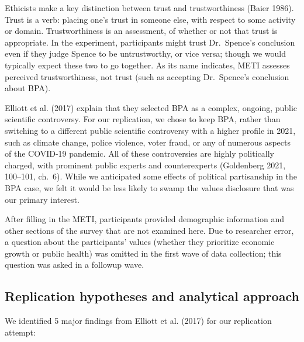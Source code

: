 \documentclass[
  letterpaper,
  DIV=11,
  numbers=noendperiod]{scrartcl}
\begin{document}
Ethicists make a key distinction between trust and trustworthiness
(Baier 1986). Trust is a verb: placing one's trust in someone else, with
respect to some activity or domain. Trustworthiness is an assessment, of
whether or not that trust is appropriate. In the experiment,
participants might trust Dr.~Spence's conclusion even if they judge
Spence to be untrustworthy, or vice versa; though we would typically
expect these two to go together. As its name indicates, METI assesses
perceived trustworthiness, not trust (such as accepting Dr.~Spence's
conclusion about BPA).

Elliott et al. (2017) explain that they selected BPA as a complex,
ongoing, public scientific controversy. For our replication, we chose to
keep BPA, rather than switching to a different public scientific
controversy with a higher profile in 2021, such as climate change,
police violence, voter fraud, or any of numerous aspects of the COVID-19
pandemic. All of these controversies are highly politically charged,
with prominent public experts and counterexperts (Goldenberg 2021,
100--101, ch.~6). While we anticipated some effects of political
partisanship in the BPA case, we felt it would be less likely to swamp
the values disclosure that was our primary interest.

After filling in the METI, participants provided demographic information
and other sections of the survey that are not examined here. Due to
researcher error, a question about the participants' values (whether
they prioritize economic growth or public health) was omitted in the
first wave of data collection; this question was asked in a followup
wave.

\hypertarget{replication-hypotheses-and-analytical-approach}{%
\subsection{Replication hypotheses and analytical
approach}\label{replication-hypotheses-and-analytical-approach}}

We identified 5 major findings from Elliott et al. (2017) for our
replication attempt:
\end{document}
